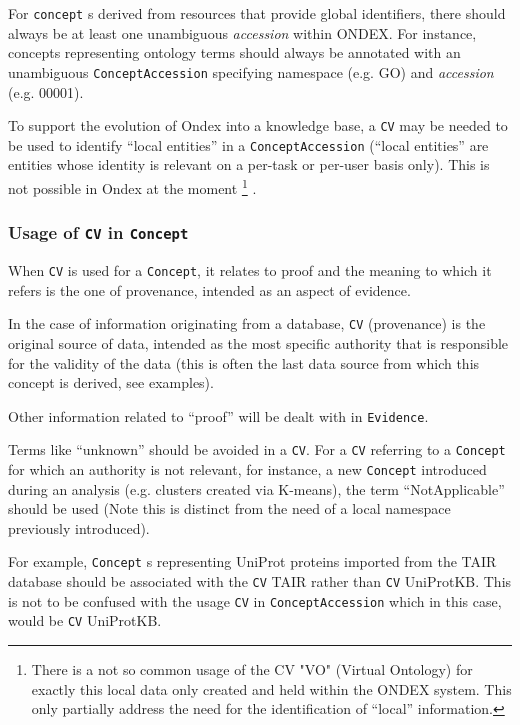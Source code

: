 \documentclass[a4paper,10pt]{article}
\newcommand{\field}[1]{\textit{#1}\xspace}
\newcommand{\term}[1]{\texttt{#1}\xspace}
\begin{document}
For \term{concept}s derived from resources that provide global
identifiers, there should always be at least one unambiguous \field{accession}
within ONDEX. For instance, concepts representing ontology terms should always
be annotated with an unambiguous \term{ConceptAccession} specifying namespace
(e.g. GO) and \field{accession} (e.g. 00001).

To support the evolution of Ondex into a knowledge base, a \term{CV} may be needed to be used to identify ``local entities''  in a
\term{ConceptAccession} (``local entities'' are entities whose identity is relevant on a per-task or per-user basis only). This is not possible in Ondex at the moment
\footnote{There is a not so common usage of the CV "VO" (Virtual Ontology) for exactly this local data only created and held within the ONDEX system. This only partially address the need for the identification of ``local'' information.}
. 

\subsubsection{Usage of \term{CV} in \term{Concept}}


When \term{CV} is used for a \term{Concept}, it relates to proof and the
meaning to which it refers is the one of provenance, intended as an aspect of
evidence.

In the case of information originating from a database, \term{CV} (provenance)
is the original source of data, intended as the most specific authority that
is responsible for the validity of the data (this is often the last data
source from which this concept is derived, see examples).

Other information related to ``proof'' will be dealt with in \term{Evidence}.

Terms like ``unknown'' should be avoided in a \term{CV}. For a \term{CV}
referring to a \term{Concept} for which an authority is not relevant, for
instance, a new \term{Concept} introduced during an analysis (e.g. clusters
created via K-means), the term ``NotApplicable'' should be used (Note this is distinct from the need of a local namespace previously introduced).

For example, \term{Concept}s representing UniProt proteins imported from the
TAIR database should be associated with the \term{CV} TAIR rather than
\term{CV} UniProtKB. This is not to be confused with the usage \term{CV} in
\term{ConceptAccession} which in this case, would be \term{CV} UniProtKB.
\end{document}

